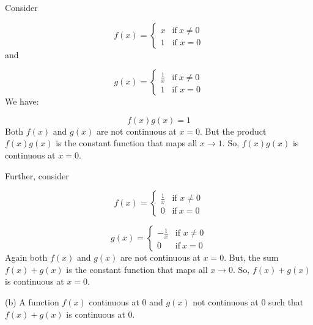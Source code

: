 \documentclass[10pt]{article}
\begin{document}
Consider 


\begin{equation*}
f( x) =\begin{cases}
x & \text{if} \ x\neq 0\\
1 & \text{if } x=0
\end{cases}
\end{equation*}
and 


\begin{equation*}
g( x) =\begin{cases}
\frac{1}{x} & \text{if} \ x\neq 0\\
1 & \text{if } x=0
\end{cases}
\end{equation*}
We have:


\begin{equation*}
f( x) g( x) =1
\end{equation*}
Both $\displaystyle f( x)$ and $\displaystyle g( x)$ are not continuous at $\displaystyle x=0$. But the product $\displaystyle f( x) g( x)$ is the constant function that maps all $\displaystyle x\rightarrow 1$. So, $\displaystyle f( x) g( x)$ is continuous at $\displaystyle x=0$.



Further, consider


\begin{equation*}
f( x) =\begin{cases}
\frac{1}{x} & \text{if } x\neq 0\\
0 & \text{if} \ x=0
\end{cases}
\end{equation*}

\begin{equation*}
g( x) =\begin{cases}
-\frac{1}{x} & \text{if } x\neq 0\\
0 & \text{if} \ x=0
\end{cases}
\end{equation*}
Again both $\displaystyle f( x)$ and $\displaystyle g( x)$ are not continuous at $\displaystyle x=0$. But, the sum $\displaystyle f( x) +g( x)$ is the constant function that maps all $\displaystyle x\rightarrow 0$. So, $\displaystyle f( x) +g( x)$ is continuous at $\displaystyle x=0$.



(b) A function $\displaystyle f( x)$ continuous at $\displaystyle 0$ and $\displaystyle g( x)$ not continuous at $\displaystyle 0$ such that $\displaystyle f( x) +g( x)$ is continuous at $\displaystyle 0$. 
\end{document}
